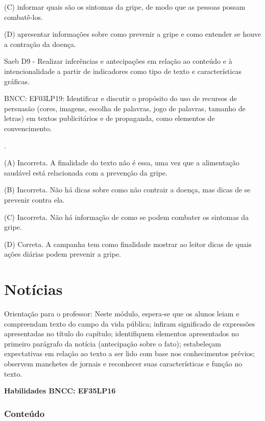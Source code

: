\begin{itemize}
{{{\begin{itemize}
\begin{itemize}
(C) informar quais são os sintomas da gripe, de modo que as pessoas
possam combatê-los.

(D) apresentar informações sobre como prevenir a gripe e como entender
se houve a contração da doença.

Saeb D9 - Realizar inferências e antecipações em relação ao conteúdo e à
intencionalidade a partir de indicadores como tipo de texto e
características gráficas.

BNCC: EF03LP19: Identificar e discutir o propósito do uso de recursos de
persuasão (cores, imagens, escolha de palavras, jogo de palavras,
tamanho de letras) em textos publicitários e de propaganda, como
elementos de convencimento.

.

(A) Incorreta. A finalidade do texto não é essa, uma vez que a
alimentação saudável está relacionada com a prevenção da gripe.

(B) Incorreta. Não há dicas sobre como não contrair a doença, mas dicas
de se prevenir contra ela.

(C) Incorreta. Não há informação de como se podem combater os sintomas
da gripe.

(D) Correta. A campanha tem como finalidade mostrar ao leitor dicas de
quais ações diárias podem prevenir a gripe.

\chapter{Notícias}

Orientação para o professor: Neste módulo, espera-se que os alunos leiam
e compreendam texto do campo da vida pública; infiram significado de
expressões apresentadas no título do capítulo; identifiquem elementos
apresentados no primeiro parágrafo da notícia (antecipação sobre o
fato); estabeleçam expectativas em relação ao texto a ser lido com base
nos conhecimentos prévios; observem manchetes de jornais e reconhecer
suas características e função no texto.

\textbf{Habilidades BNCC: EF35LP16}


\begin{itemize}
\subsection{Conteúdo}\label{conteuxfado-4}


\end{itemize}
\end{itemize}
\end{itemize}}}}
\end{itemize}
